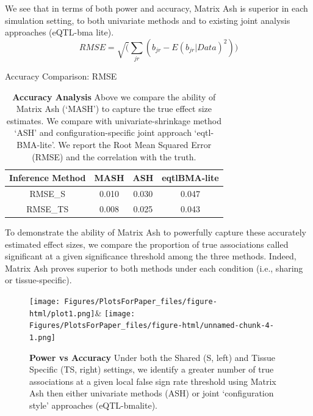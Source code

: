 We see that in terms of both power and accuracy, Matrix Ash is superior in each simulation setting, to both univariate methods and to existing joint analysis approaches (eQTL-bma lite).
\begin{equation}
RMSE = \sqrt(\sum_{jr}(b_{jr}-E(b_{jr}|Data)^2))
\end{equation}
\begin{table}[ht]
\caption{Accuracy Comparison: RMSE}
\centering
\begin{tabular}{c c c c}
\hline\hline
Inference Method & MASH & ASH & eqtlBMA-lite \\ [0.5ex] %
\hline
RMSE_{S}&0.010&0.030&0.047\\
RMSE_{TS}&0.008& 0.025&0.043%
\hline
\end{tabular}
\label{table:RMSE}
\caption{\textbf{Accuracy Analysis} Above we compare the ability of Matrix Ash (`MASH') to capture the true effect size estimates. We compare with univariate-shrinkage method `ASH' and configuration-specific joint approach `eqtl-BMA-lite'. We report the Root Mean Squared Error (RMSE) and the correlation with the truth.}
\end{table}

To demonstrate the ability of Matrix Ash to powerfully capture these accurately estimated effect sizes, we compare the proportion of true associations called significant at a given significance threshold among the three methods. Indeed, Matrix Ash proves superior to both methods under each condition (i.e., sharing or tissue-specific). \newline



\begin{figure}[h]
\texttt{[image: Figures/PlotsForPaper\_files/figure-html/plot1.png]}&
\texttt{[image: Figures/PlotsForPaper\_files/figure-html/unnamed-chunk-4-1.png]}
\caption{\textbf{Power vs Accuracy} Under both the Shared (S, left) and Tissue Specific (TS, right) settings, we identify a greater number of true associations at a given local false sign rate threshold using Matrix Ash then either univariate methods (ASH) or joint `configuration style' approaches (eQTL-bmalite).}
\label{fig:powervaccuracy}
\end{figure}\newline


